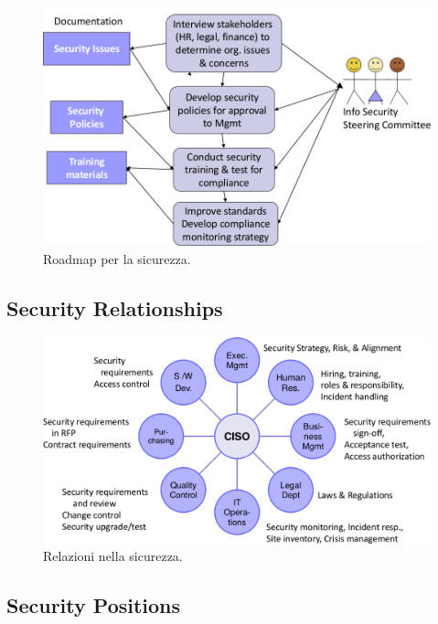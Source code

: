 \begin{figure}[h!]
        \begin{center}
                \includegraphics[scale=0.3]{res/img/roadmap}
        \end{center}
        \caption{Roadmap per la sicurezza.}
\end{figure}

\subsection{Security Relationships}

\begin{figure}[h!]
        \begin{center}
                \includegraphics[scale=0.3]{res/img/relationships}
        \end{center}
        \caption{Relazioni nella sicurezza.}
\end{figure}


\subsection{Security Positions}
\label{SA}

